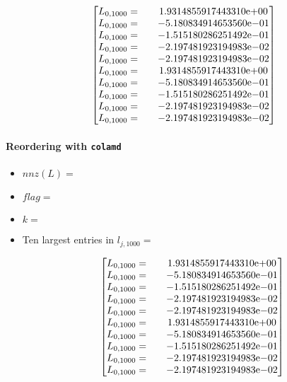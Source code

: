 \begin{enumerate}
\begin{itemize}
$$
\begin{bmatrix}
L_{0,1000}=  & \quad {1.9314855917443310}\mathrm{e}{+00}\\
L_{0,1000}=  & \quad {-5.180834914653560}\mathrm{e}{-01}\\
L_{0,1000}=  & \quad {-1.515180286251492}\mathrm{e}{-01}\\
L_{0,1000}=  & \quad {-2.197481923194983}\mathrm{e}{-02}\\
L_{0,1000}=  & \quad {-2.197481923194983}\mathrm{e}{-02}\\
L_{0,1000}=  & \quad {1.9314855917443310}\mathrm{e}{+00}\\
L_{0,1000}=  & \quad {-5.180834914653560}\mathrm{e}{-01}\\
L_{0,1000}=  & \quad {-1.515180286251492}\mathrm{e}{-01}\\
L_{0,1000}=  & \quad {-2.197481923194983}\mathrm{e}{-02}\\
L_{0,1000}=  & \quad {-2.197481923194983}\mathrm{e}{-02}\\
\end{bmatrix}
$$
\end{itemize}
\newpage
\paragraph*{Reordering with \texttt{colamd}}
\begin{itemize}
\item $nnz(L)= $
\item $flag= $
\item $k= $
\item Ten largest entries in $l_{j,1000}= $

$$
\begin{bmatrix}
L_{0,1000}=  & \quad {1.9314855917443310}\mathrm{e}{+00}\\
L_{0,1000}=  & \quad {-5.180834914653560}\mathrm{e}{-01}\\
L_{0,1000}=  & \quad {-1.515180286251492}\mathrm{e}{-01}\\
L_{0,1000}=  & \quad {-2.197481923194983}\mathrm{e}{-02}\\
L_{0,1000}=  & \quad {-2.197481923194983}\mathrm{e}{-02}\\
L_{0,1000}=  & \quad {1.9314855917443310}\mathrm{e}{+00}\\
L_{0,1000}=  & \quad {-5.180834914653560}\mathrm{e}{-01}\\
L_{0,1000}=  & \quad {-1.515180286251492}\mathrm{e}{-01}\\
L_{0,1000}=  & \quad {-2.197481923194983}\mathrm{e}{-02}\\
L_{0,1000}=  & \quad {-2.197481923194983}\mathrm{e}{-02}\\
\end{bmatrix}
$$
\end{itemize}

\end{enumerate}
